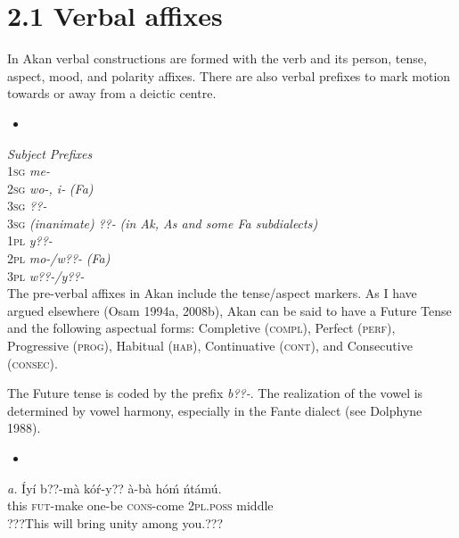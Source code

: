 \documentclass[output=paper]{langsci/langscibook}
\begin{document}
\section{2.1  Verbal affixes}

In Akan verbal constructions are  formed with the verb and its person, tense, aspect, mood, and polarity affixes. There are also verbal prefixes to mark motion towards or away from a deictic centre.

\begin{itemize}
\item \ea\label{ex:}
\\
\end{itemize}
     \emph{        }\emph{\textup{Subject }}\emph{\textup{Prefixes}}\\
     \textsc{1sg  }\emph{\textup{      }}\emph{me-}\\
     \textsc{2sg  }\emph{      wo-, i- }\emph{\textup{(Fa)}}\\
     \textsc{3sg  }\emph{      ??{}-}\\
     \textsc{3sg}\emph{\textup{ (inanimate)}}\emph{    ??{}- }\emph{\textup{(in Ak, As and some Fa subdialects)}}\\
     \textsc{1pl  }\emph{      y??-}\\
     \textsc{2pl  }\emph{      mo-/w??- }\emph{\textup{(Fa)}}\emph{  }\\
     \textsc{3pl  }\emph{      w??-/y??-}\\
The pre-verbal affixes in Akan include the tense/aspect markers. As I have argued elsewhere (Osam 1994a, 2008b), Akan can be said to have a Future Tense and the following aspectual forms: Completive (\textsc{compl}), Perfect (\textsc{perf}), Progressive (\textsc{prog}), Habitual (\textsc{hab}), Continuative (\textsc{cont}), and Consecutive (\textsc{consec}).

The Future tense is coded by the prefix \emph{b??-}. The realization of the vowel is determined by vowel harmony, especially in the Fante dialect (see Dolphyne 1988).

\begin{itemize}
\item \end{itemize}
\gll \emph{a.}  \'{I}y\'{i}  b??-m\`{a}    k\'{o}\'{r}-y??    \`{a}-b\`{a}    h\'{o}\'{m}    \'{n}t\'{a}m\'{u}.\\
       this  \textsc{fut}{}-make  one-be    \textsc{cons}{}-come  \textsc{2pl.poss}  middle\\
\glt ???This will bring unity among you.??? \citep[79]{Krampah1970}
\z
\end{document}
